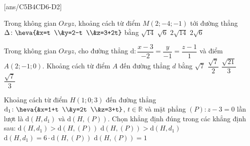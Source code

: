 \TN
{}[ans/C5B4CD6-D2]
\begin{ex}%
	Trong không gian $Oxyz$, khoảng cách từ điểm $M(2;-4;-1)$ tới đường thẳng $\Delta\colon \heva{&x=t \\&y=2-t \\&z=3+2t}$ bằng
\choice
{$\sqrt{14}$}
{$\sqrt{6}$}
{\True $2\sqrt{14}$}
{$2\sqrt{6}$}
\end{ex}
\begin{ex}%
	Trong không gian $Oxyz$, cho đường thẳng $\mathrm{d}\colon\dfrac{x-3}{-2}=\dfrac{y}{-1}=\dfrac{z-1}{1}$ và điểm $A(2;-1;0)$. Khoảng cách từ điểm $A$ đến đường thẳng $d$ bằng
\choice
{$\sqrt{7}$}
{$\dfrac{\sqrt{7}}{2}$}
{\True $\dfrac{\sqrt{21}}{3}$}
{$\dfrac{\sqrt{7}}{3}$}
\end{ex}
\begin{ex}%
	Khoảng cách từ điểm $H(1;0;3)$ đến đường thẳng $\mathrm{d}_1\colon \heva{&x=1+t \\&y=2t \\&z=3+t}$, $t\in \mathbb{R}$ và mặt phẳng $(P)\colon z-3=0$ lần lượt là $\mathrm{d}(H,d_1)$ và $\mathrm{d}(H,(P))$. Chọn khẳng định đúng trong các khẳng định sau:
	\choice
	{$\mathrm{d}(H,d_1)>\mathrm{d}(H,(P))$}
	{$\mathrm{d}(H,(P))>\mathrm{d}(H,d_1)$}
	{\True $\mathrm{d}(H,d_1)=6\cdot \mathrm{d}(H,(P))$}
	{$\mathrm{d}(H,(P))=1$}
\end{ex}

